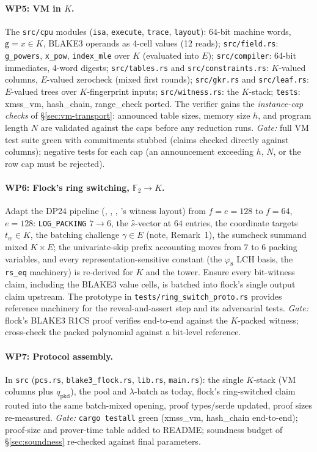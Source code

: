 \documentclass[11pt]{article}
\newcommand{\F}{\mathbb{F}}
\newcommand{\K}{K}            %
\newcommand{\E}{E}            %
\newcommand{\gen}{\mathsf{g}}
\newcommand{\pkd}{\mathrm{pkd}}
\newcommand{\WP}[1]{\textbf{WP#1}}
\begin{document}
\paragraph{\WP{5}: VM in $\K$.}
The \texttt{src/cpu} modules (\texttt{isa}, \texttt{execute},
\texttt{trace}, \texttt{layout}): 64-bit machine words, $\gen=x\in\K$,
BLAKE3 operands as 4-cell values (12 reads);
\texttt{src/field.rs}: \texttt{g\_powers}, \texttt{x\_pow},
\texttt{index\_mle} over $\K$ (evaluated into $\E$);
\texttt{src/compiler}: 64-bit immediates, 4-word digests;
\texttt{src/tables.rs} and \texttt{src/constraints.rs}: $\K$-valued
columns, $\E$-valued zerocheck (mixed first rounds); \texttt{src/gkr.rs}
and \texttt{src/leaf.rs}: $\E$-valued trees over $\K$-fingerprint inputs;
\texttt{src/witness.rs}: the $\K$-stack; \texttt{tests}: xmss\_vm,
hash\_chain, range\_check ported. The verifier gains the
\emph{instance-cap checks} of \S\ref{sec:vm-transport}: announced table
sizes, memory size $h$, and program length $N$ are validated against the
caps before any reduction runs.
\emph{Gate:} full VM test suite green with commitments stubbed (claims
checked directly against columns); negative tests for each cap (an
announcement exceeding $h$, $N$, or the row cap must be rejected).

\paragraph{\WP{6}: Flock's ring switching, $\F_2\to\K$.}
Adapt the DP24 pipeline (, ,
, 's witness layout) from
$f=e=128$ to $f=64$, $e=128$: \texttt{LOG\_PACKING} $7\to6$, the
$\widehat s$-vector at $64$ entries, the coordinate targets $t_w\in\K$,
the batching challenge $\gamma\in\E$ (note, Remark~1), the sumcheck
summand mixed $\K\times\E$; the univariate-skip prefix accounting moves
from $7$ to $6$ packing variables, and every representation-sensitive
constant (the $\varphi_8$ LCH basis, the \texttt{rs\_eq} machinery) is
re-derived for $\K$ and the tower. Ensure every bit-witness claim,
including the BLAKE3 value cells, is batched into flock's single output
claim upstream. The prototype in \texttt{tests/ring\_switch\_proto.rs}
provides reference machinery for the reveal-and-assert step and its
adversarial tests.
\emph{Gate:} flock's BLAKE3 R1CS proof verifies end-to-end against the
$\K$-packed witness; cross-check the packed polynomial against a bit-level
reference.

\paragraph{\WP{7}: Protocol assembly.}
In \texttt{src} (\texttt{pcs.rs}, \texttt{blake3\_flock.rs},
\texttt{lib.rs}, \texttt{main.rs}): the single $\K$-stack (VM columns plus
$q_\pkd$), the pool and $\lambda$-batch as today, flock's ring-switched
claim routed into the same batch-mixed opening, proof types/serde
updated, proof sizes re-measured.
\emph{Gate:} \texttt{cargo testall} green (xmss\_vm, hash\_chain
end-to-end); proof-size and prover-time table added to README; soundness
budget of \S\ref{sec:soundness} re-checked against final parameters.
\end{document}
